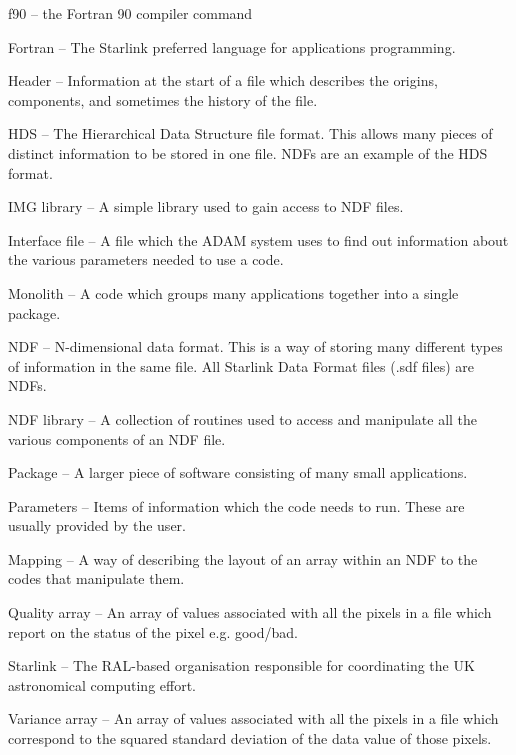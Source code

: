 {\sf f90} -- the Fortran 90 compiler command

{\sf Fortran} -- The Starlink preferred language for applications programming.

{\sf Header} --
Information at the start of a file which describes the origins, components,
and sometimes the history of the file. 

{\sf HDS} --
The Hierarchical Data Structure file format. This allows many pieces of
distinct information to be stored in one file. NDFs are an example of
the HDS format.

{\sf IMG library} --
A simple library used to gain access to NDF files.

{\sf Interface file} -- A file which the ADAM system uses to find out
information about the various parameters needed to use a code.

{\sf Monolith} --
A code which groups many applications together into a single package.

{\sf NDF} -- N-dimensional data format. This is a way of storing many 
different types of information in the same file. All Starlink Data Format 
files (.sdf files) are NDFs.

{\sf NDF library} --
A collection of routines used to access and manipulate all the various
components of an NDF file.

{\sf Package} -- A larger piece of software consisting of many small 
applications.

{\sf Parameters} -- Items of information which the code needs to run. These
are usually provided by the user.

{\sf Mapping} -- A way of describing the layout of an array within an NDF
to the codes that manipulate them.

{\sf Quality array} -- An array of values associated with all the pixels in
a file which report on the status of the pixel e.g. good/bad. 

{\sf Starlink} -- The RAL-based organisation responsible for
coordinating the UK astronomical computing effort.

{\sf Variance array} -- An array of values associated with all the pixels in
a file which correspond to the squared standard deviation of the data 
value of those pixels.


